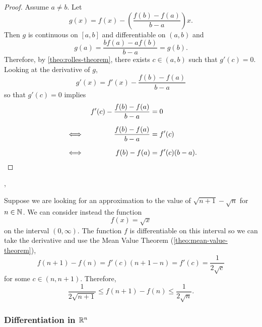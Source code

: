\documentclass[../MathsNotesBase.tex]{subfiles}
\begin{document}
{\begin{proof}
			Assume ${ a \neq b }$. Let
			\[ g(x) = f(x) - \left( \frac{f(b) - f(a)}{b - a} \right) x. \]
			Then $g$ is continuous on ${ [a,b] }$ and differentiable on ${ (a,b) }$ and
			\[ g(a) = \frac{b f(a) - a f(b)}{b - a} = g(b). \]
			Therefore, by \autoref{theo:rolles-theorem}, there exists ${ c \in (a,b) }$ such that ${ g'(c) = 0 }$.\\
			
			Looking at the derivative of $g$,
			\[ g'(x) = f'(x) - \frac{f(b) - f(a)}{b - a} \]
			so that ${ g'(c) = 0 }$ implies
			\[\begin{aligned}
				&& f'(c) - \frac{f(b) - f(a)}{b - a} &= 0 \nn
				&\iff & \frac{f(b) - f(a)}{b - a} &= f'(c) \nn
				&\iff & f(b) - f(a) &= f'(c)(b - a).  \qedhere
			\end{aligned}\]
		\end{proof}
	
		
		\biggerskip
		\sep
		\begin{exe}
			\ex Suppose we are looking for an approximation to the value of ${ \sqrt{n + 1} - \sqrt{n} }$ for ${ n \in \mathbb{N}^{} }$. We can consider instead the function
			\[ f(x) = \sqrt{x} \]
			on the interval ${ (0,\infty) }$. The function $f$ is differentiable on this interval so we can take the derivative and use the Mean Value Theorem (\autoref{theo:mean-value-theorem}),
			\[ f(n + 1) - f(n) = f'(c)(n + 1 - n) = f'(c) = \frac{1}{2\sqrt{c}} \]
			for some ${ c \in (n, n+1) }$. Therefore,
			\[ \frac{1}{2\sqrt{n+1}} \leq f(n + 1) - f(n) \leq \frac{1}{2\sqrt{n}}. \]
		\end{exe}
	
	
	
		
		\nl[12]
		\subsubsection{Differentiation in \texorpdfstring{$\mathbb{R}^{n}$}{Rn}}
		\biggerskip
		
		\nl[4]
		}
\end{document}
